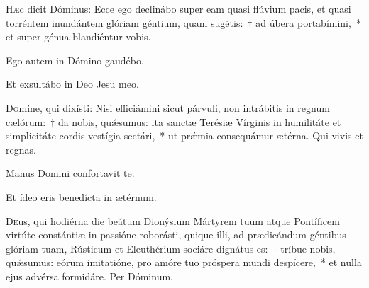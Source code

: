 \documentclass[vesperale_romanum.tex]{subfiles}
\begin{document}
 
\lettrine{H}{æ}c dicit Dóminus: Ecce ego declinábo super eam quasi flúvium pacis, et quasi torréntem inundántem glóriam géntium, quam sugétis:~† ad úbera portabímini,~* et super génua blandiéntur vobis. 

\hymnus

 
 \vv Ego autem in Dómino gaudébo.
 
 \rr Et exsultábo in Deo Jesu meo.

\admagnificat


\oratio

\lettrine{D}{o}mine, qui dixísti: Nisi efficiámini sicut párvuli, non intrábitis in regnum cælórum:~† da nobis, quǽsumus: ita san\-ctæ Terésiæ Vírginis in humilitáte et simplicitáte cordis vestígia se\-ctári,~* ut prǽmia consequámur ætérna.
Qui vivis et regnas.



\ivesperisrubric

\hymnus


\vv Manus Domini confortavit te.

\rr Et ídeo eris benedícta in ætérnum.

\admagnificat



\myrule



\duplex

\oratio

\lettrine{D}{e}us, qui hodiérna die beátum Dionýsium Mártyrem tuum atque Pontíficem virtúte constántiæ in passióne roborásti, quique illi, ad prædicándum géntibus glóriam tuam, Rústicum et Eleuthérium sociáre dignátus es:~† tríbue nobis, quǽsumus: eórum imitatióne, pro amóre tuo próspera mundi despícere,~* et nulla ejus advérsa formidáre.
Per Dóminum.
\end{document}
